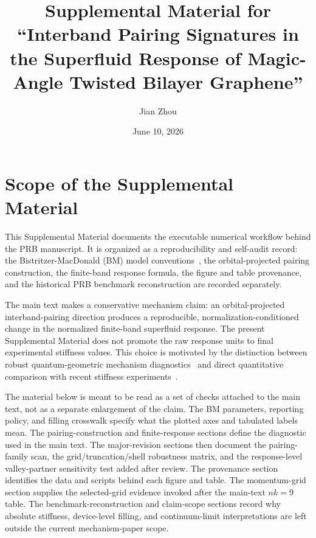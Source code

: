 \documentclass[aps,prb,preprint,superscriptaddress,floatfix,nofootinbib]{revtex4-2}
\begin{document}
\title{Supplemental Material for ``Interband Pairing Signatures in the Superfluid Response of Magic-Angle Twisted Bilayer Graphene''}

\author{Jian Zhou}

\date{June 10, 2026}

\maketitle

\section{Scope of the Supplemental Material}

This Supplemental Material documents the executable numerical workflow behind
the PRB manuscript.  It is organized as a reproducibility and self-audit record:
the Bistritzer-MacDonald (BM) model conventions~\cite{bistritzer_2011}, the
orbital-projected pairing construction, the finite-band response formula, the
figure and table provenance, and the historical PRB benchmark reconstruction
are recorded separately.

The main text makes a conservative mechanism claim: an orbital-projected
interband-pairing direction produces a reproducible, normalization-conditioned
change in the normalized finite-band superfluid response.  The present
Supplemental Material does not promote the raw response units to final
experimental stiffness values.  This choice is motivated by the distinction
between robust quantum-geometric mechanism diagnostics~\cite{peotta_torma_2015,hu_2019,julku_2020,xie_2020_prl}
and direct quantitative comparison with recent stiffness
experiments~\cite{tian_2023,tanaka_2025}.

The material below is meant to be read as a set of checks attached to the main
text, not as a separate enlargement of the claim.  The BM parameters, reporting
policy, and filling crosswalk specify what the plotted axes and tabulated
labels mean.  The pairing-construction and finite-response sections define the
diagnostic used in the main text.  The major-revision sections then document
the pairing-family scan, the grid/truncation/shell robustness matrix, and the
response-level valley-partner sensitivity test added after review.  The
provenance section identifies the data and scripts behind each figure and
table.  The momentum-grid section supplies the selected-grid evidence invoked
after the main-text $nk=9$ table.  The benchmark-reconstruction and
claim-scope sections record why absolute stiffness, device-level filling, and
continuum-limit interpretations are left outside the current mechanism-paper
scope.
\end{document}
